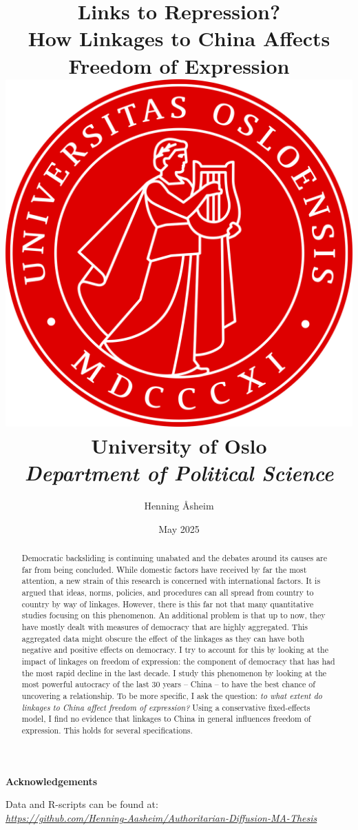 \documentclass[12pt]{report} %
\title{
    {\textbf{Links to Repression?}}\\
    {\Large How Linkages to China Affects Freedom of Expression} \\
    \vspace{10mm}
    {\includegraphics[width = .6\textwidth]{graphics/uio_segl_roedt_liten_kant.png}} \\
    \vspace{10mm}
    {\large University of Oslo} \\
    {\small\textit{Department of Political Science}} \\
}
\author{Henning Åsheim}
\date{May 2025}
\begin{document}
\maketitle


\begin{abstract}
    Democratic backsliding is continuing unabated and the debates around its causes are far from being concluded. While domestic factors have received by far the most attention, a new strain of this research is concerned with international factors. It is argued that ideas, norms, policies, and procedures can all spread from country to country by way of linkages. However, there is this far not that many quantitative studies focusing on this phenomenon. An additional problem is that up to now, they have mostly dealt with measures of democracy that are highly aggregated. This aggregated data might obscure the effect of the linkages as they can have both negative and positive effects on democracy. I try to account for this by looking at the impact of linkages on freedom of expression: the component of democracy that has had the most rapid decline in the last decade. I study this phenomenon by looking at the most powerful autocracy of the last 30 years -- China -- to have the best chance of uncovering a relationship. To be more specific, I ask the question: \textit{to what extent do linkages to China affect freedom of expression?} Using a conservative fixed-effects model, I find no evidence that linkages to China in general influences freedom of expression. This holds for several specifications.
\end{abstract}

\newpage

\begin{center}
    \large
    \textbf{Acknowledgements}
\end{center}

\newpage
\thispagestyle{empty}
\vspace*{\fill}
\begin{center}
    Data and R-scripts can be found at: \\
    \href{https://github.com/Henning-Aasheim/Authoritarian-Diffusion-MA-Thesis}{\textit{https://github.com/Henning-Aasheim/Authoritarian-Diffusion-MA-Thesis}}
\end{center}
\vspace*{\fill}

\newpage

\tableofcontents
\end{document}
